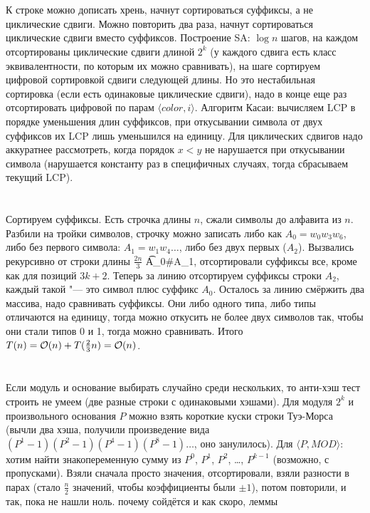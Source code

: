 \section{} %
К строке можно дописать хрень, начнут сортироваться суффиксы, а не циклические сдвиги.
Можно повторить два раза, начнут сортироваться циклические сдвиги вместо суффиксов.
Построение SA: $\log n$ шагов, на каждом отсортированы циклические сдвиги длиной $2^k$ (у каждого сдвига есть класс эквивалентности, по которым их можно сравнивать), на шаге сортируем цифровой сортировкой сдвиги следующей длины.
Но это нестабильная сортировка (если есть одинаковые циклические сдвиги), надо в конце еще раз отсортировать цифровой по парам $\langle color, i \rangle$.
Алгоритм Касаи: вычисляем LCP в порядке уменьшения длин суффиксов, при откусывании символа от двух суффиксов их LCP лишь уменьшился на единицу.
Для циклических сдвигов надо аккуратнее рассмотреть, когда порядок $x<y$ не нарушается при откусывании символа (нарушается константу раз в специфичных случаях, тогда сбрасываем текущий LCP).

\section{} %
Сортируем суффиксы.
Есть строчка длины $n$, сжали символы до алфавита из $n$.
Разбили на тройки символов, строчку можно записать либо как $A_0=w_0w_3w_6$, либо без первого символа: $A_1=w_1w_4\dots$, либо без двух первых ($A_2$).
Вызвались рекурсивно от строки длины $\frac{2n}{3}$ \t{A_0\#A_1}, отсортировали суффиксы все, кроме как для позиций $3k+2$.
Теперь за линию отсортируем суффиксы строки $A_2$, каждый такой "--- это символ плюс суффикс $A_0$.
Осталось за линию смёржить два массива, надо сравнивать суффиксы.
Они либо одного типа, либо типы отличаются на единицу, тогда можно откусить не более двух символов так, чтобы они стали типов 0 и 1, тогда можно сравнивать.
Итого $T(n) = \mathcal{O}(n) + T(\frac23 n) = \mathcal{O}(n)$.

\section{} %
Если модуль и основание выбирать случайно среди нескольких, то анти-хэш тест строить не умеем (две разные строки с одинаковыми хэшами).
Для модуля $2^k$ и произвольного основания $P$ можно взять короткие куски строки Туэ-Морса (вычли два хэша, получили произведение вида $(P^1-1)(P^2-1)(P^4-1)(P^8-1)\dots$, оно занулилось).
Для $\langle P, MOD \rangle$: хотим найти знакопеременную сумму из $P^0$, $P^1$, $P^2$, \dots, $P^{k-1}$ (возможно, с пропусками).
Взяли сначала просто значения, отсортировали, взяли разности в парах (стало $\frac n 2$ значений, чтобы коэффициенты были $\pm 1$), потом повторили, и так, пока не нашли ноль.
\TODO почему сойдётся и как скоро, леммы

